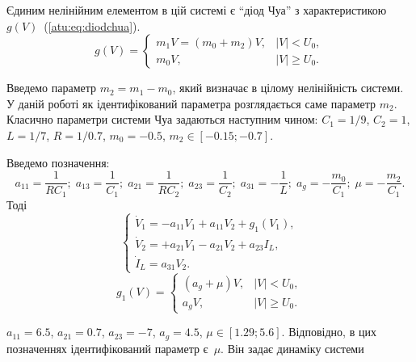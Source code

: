 \documentclass[a4paper,13pt]{atuaref}
\begin{document}
Єдиним нелінійним елементом в цій системі є ``діод Чуа'' з характеристикою
$g(V)$~(\ref{atu:eq:diodchua}).
%
%
\begin{equation}
g(V) =
\begin{cases}
  m_1 V = ( m_0 + m_2 ) V , & |V| <   U_0, \\
  m_0 V ,                   & |V| \ge U_0.
\end{cases}
\label{atu:eq:diodchua}
\end{equation}

Введемо параметр \(m_2 = m_1 - m_0 \), який визначає в цілому нелінійність
системи. У даній роботі як ідентифікований параметра розглядається саме
параметр \(m_2 \).
Класично параметри системи Чуа задаються наступним чином:
$C_1 = 1/9$, $C_2 = 1$, $L= 1/7$, $R = 1/0.7$, $m_0=-0.5$, $ m_2 \in [ -0.15; -0.7 ] $.

Введемо позначення:
\[
  a_{11} = \frac{1}{R C_1}; \;
  a_{13} = \frac{1}{C_1}; \;
  a_{21} = \frac{1}{R C_2}; \;
  a_{23} = \frac{1}{C_2}; \;
  a_{31} = -\frac{1}{L}; \;
  a_g = - \frac{m_0}{C_1}; \;
  \mu = - \frac{m_2}{C_1}.
\]
%
Тоді
%
\begin{equation}
\begin{cases}
  \dot{V}_1  = -a_{11} V_1 + a_{11}  V_2  + g_1(V_1) , \\
  \dot{V}_2  = +a_{21} V_1 - a_{21}  V_2  + a_{23} I_L    , \\
  \dot{I}_L  =  a_{31} V_2.
\end{cases}
\label{atu:eq:chua2}
\end{equation}
%
%
\begin{equation}
g_1(V) =
\begin{cases}
  ( a_g + \mu ) V , & |V| <   U_0, \\
  a_g V           , & |V| \ge U_0.
\end{cases}
\label{atu:eq:diodchua2}
\end{equation}

\noindent
$ a_{11} = 6.5 $, $a_{21} = 0.7$, $ a_{23} = -7 $, $ a_g = 4.5 $,
$ \mu \in [ 1.29 ; 5.6 ] $.
Відповідно, в цих позначеннях ідентифікований параметр є~$\mu$.
Він задає динаміку системи
%
\end{document}

